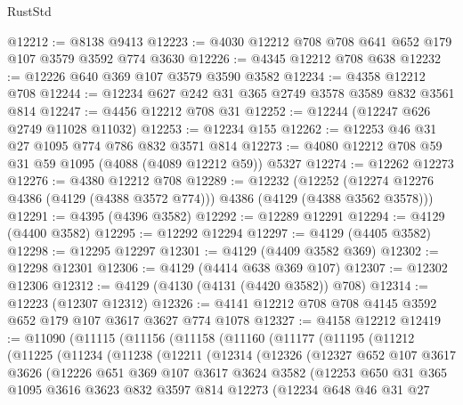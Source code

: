 \begin{lexlean}{RustStd}
\begin{coremodule}
@12212 := @8138 @9413
@12223 := @4030 @12212 @708 @708 @641 @652 @179 @107 @3579 @3592 @774 @3630
@12226 := @4345 @12212 @708 @638
@12232 := @12226 @640 @369 @107 @3579 @3590 @3582
@12234 := @4358 @12212 @708
@12244 := @12234 @627 @242 @31 @365 @2749 @3578 @3589 @832 @3561 @814
@12247 := @4456 @12212 @708 @31
@12252 := @12244 (@12247 @626 @2749 @11028 @11032)
@12253 := @12234 @155
@12262 := @12253 @46 @31 @27 @1095 @774 @786 @832 @3571 @814
@12273 := @4080 @12212 @708 @59 @31 @59 @1095 (@4088 (@4089 @12212 @59)) @5327
@12274 := @12262 @12273
@12276 := @4380 @12212 @708
@12289 := @12232
    (@12252 (@12274 @12276 @4386 (@4129 (@4388 @3572 @774))) @4386 (@4129 (@4388 @3562 @3578)))
@12291 := @4395 (@4396 @3582)
@12292 := @12289 @12291
@12294 := @4129 (@4400 @3582)
@12295 := @12292 @12294
@12297 := @4129 (@4405 @3582)
@12298 := @12295 @12297
@12301 := @4129 (@4409 @3582 @369)
@12302 := @12298 @12301
@12306 := @4129 (@4414 @638 @369 @107)
@12307 := @12302 @12306
@12312 := @4129 (@4130 (@4131 (@4420 @3582)) @708)
@12314 := @12223 (@12307 @12312)
@12326 := @4141 @12212 @708 @708 @4145 @3592 @652 @179 @107 @3617 @3627 @774 @1078
@12327 := @4158 @12212
@12419 := @11090
    (@11115
      (@11156
        (@11158
          (@11160
            (@11177
              (@11195
                (@11212
                  (@11225
                    (@11234
                      (@11238
                        (@12211
                          (@12314
                            (@12326
                              (@12327
                                @652
                                @107
                                @3617
                                @3626
                                (@12226
                                  @651
                                  @369
                                  @107
                                  @3617
                                  @3624
                                  @3582
                                  (@12253
                                    @650
                                    @31
                                    @365
                                    @1095
                                    @3616
                                    @3623
                                    @832
                                    @3597
                                    @814
                                    @12273
                                    (@12234
                                      @648
                                      @46
                                      @31
                                      @27

\end{coremodule}
\end{lexlean}
